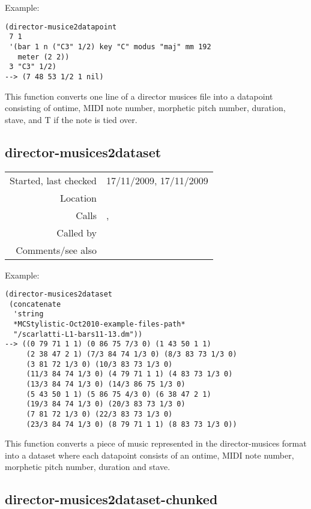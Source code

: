 \vspace{0.5cm}
\noindent Example:
\begin{verbatim}
(director-musice2datapoint
 7 1
 '(bar 1 n ("C3" 1/2) key "C" modus "maj" mm 192
   meter (2 2))
 3 "C3" 1/2)
--> (7 48 53 1/2 1 nil)
\end{verbatim}

\noindent This function converts one line of a
director musices file into a datapoint consisting of
ontime, MIDI note number, morphetic pitch number,
duration, stave, and T if the note is tied over.


\subsection*{director-musices2dataset}\label{fun:director-musices2dataset}

\vspace{0.3cm}
\begin{tabular}{r|p{8cm}}
Started, last checked & 17/11/2009, 17/11/2009 \\
Location & \nameref{sec:director-musices} \\
Calls & \nameref{fun:director-musices2dataset-chunked},\newline \nameref{fun:resolve-ties} \\
Called by & \\
Comments/see also &
\end{tabular}

\vspace{0.5cm}
\noindent Example:
\begin{verbatim}
(director-musices2dataset
 (concatenate
  'string
  *MCStylistic-Oct2010-example-files-path*
  "/scarlatti-L1-bars11-13.dm"))
--> ((0 79 71 1 1) (0 86 75 7/3 0) (1 43 50 1 1)
     (2 38 47 2 1) (7/3 84 74 1/3 0) (8/3 83 73 1/3 0)
     (3 81 72 1/3 0) (10/3 83 73 1/3 0)
     (11/3 84 74 1/3 0) (4 79 71 1 1) (4 83 73 1/3 0)
     (13/3 84 74 1/3 0) (14/3 86 75 1/3 0)
     (5 43 50 1 1) (5 86 75 4/3 0) (6 38 47 2 1)
     (19/3 84 74 1/3 0) (20/3 83 73 1/3 0)
     (7 81 72 1/3 0) (22/3 83 73 1/3 0)
     (23/3 84 74 1/3 0) (8 79 71 1 1) (8 83 73 1/3 0))
\end{verbatim}

\noindent This function converts a piece of music
represented in the director-musices format into a
dataset where each datapoint consists of an ontime,
MIDI note number, morphetic pitch number, duration and
stave.


\subsection*{director-musices2dataset-chunked}\label{fun:director-musices2dataset-chunked}

